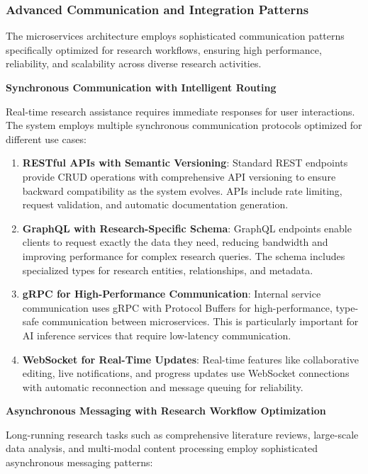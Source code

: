 \documentclass[10pt,twocolumn]{article}
\begin{document}
\subsubsection{Advanced Communication and Integration Patterns}

The microservices architecture employs sophisticated communication patterns specifically optimized for research workflows, ensuring high performance, reliability, and scalability across diverse research activities.

\textbf{Synchronous Communication with Intelligent Routing}

Real-time research assistance requires immediate responses for user interactions. The system employs multiple synchronous communication protocols optimized for different use cases:

\begin{enumerate}
    \item \textbf{RESTful APIs with Semantic Versioning}: Standard REST endpoints provide CRUD operations with comprehensive API versioning to ensure backward compatibility as the system evolves. APIs include rate limiting, request validation, and automatic documentation generation.
    
    \item \textbf{GraphQL with Research-Specific Schema}: GraphQL endpoints enable clients to request exactly the data they need, reducing bandwidth and improving performance for complex research queries. The schema includes specialized types for research entities, relationships, and metadata.
    
    \item \textbf{gRPC for High-Performance Communication}: Internal service communication uses gRPC with Protocol Buffers for high-performance, type-safe communication between microservices. This is particularly important for AI inference services that require low-latency communication.
    
    \item \textbf{WebSocket for Real-Time Updates}: Real-time features like collaborative editing, live notifications, and progress updates use WebSocket connections with automatic reconnection and message queuing for reliability.
\end{enumerate}

\textbf{Asynchronous Messaging with Research Workflow Optimization}

Long-running research tasks such as comprehensive literature reviews, large-scale data analysis, and multi-modal content processing employ sophisticated asynchronous messaging patterns:
\end{document}
